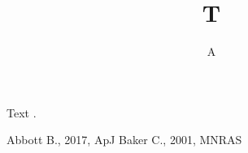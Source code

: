 \documentclass{mnras}
\begin{document}
\title{T}\author{A}\maketitle
Text \cite{a}.
\begin{thebibliography}{}
 Abbott B., 2017, ApJ
 Baker C., 2001, MNRAS
\end{thebibliography}
\end{document}
